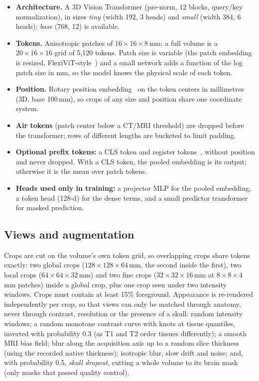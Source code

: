 \documentclass[10pt]{article}
\begin{document}
\begin{itemize}
  \item \textbf{Architecture.} A 3D Vision Transformer (pre-norm, 12 blocks, query/key normalization), in sizes
  \emph{tiny} (width 192, 3 heads) and \emph{small} (width 384, 6 heads); \emph{base} (768, 12) is available.
  \item \textbf{Tokens.} Anisotropic patches of $16\times16\times8$\,mm; a full volume is a $20\times16\times16$ grid
  of 5{,}120 tokens. Patch size is variable (the patch embedding is resized, FlexiViT-style~\cite{flexivit}) and a
  small network adds a function of the log patch size in mm, so the model knows the physical scale of each token.
  \item \textbf{Position.} Rotary position embedding~\cite{rope} on the token centers in millimetres (3D, base
  100\,mm), so crops of any size and position share one coordinate system.
  \item \textbf{Air tokens} (patch center below a CT/MRI threshold) are dropped before the transformer; rows of
  different lengths are bucketed to limit padding.
  \item \textbf{Optional prefix tokens:} a CLS token and register tokens~\cite{registers}, without position and never
  dropped. With a CLS token, the pooled embedding is its output; otherwise it is the mean over patch tokens.
  \item \textbf{Heads used only in training:} a projector MLP for the pooled embedding, a token head (128-d) for the
  dense terms, and a small predictor transformer for masked prediction.
\end{itemize}

\subsection{Views and augmentation}

Crops are cut on the volume's own token grid, so overlapping crops share tokens exactly: two global crops
($128\times128\times64$\,mm, the second inside the first), two local crops ($64\times64\times32$\,mm) and two fine crops
($32\times32\times16$\,mm at $8\times8\times4$\,mm patches) inside a global crop, plus one crop seen under two
intensity windows. Crops must contain at least 15\% foreground. Appearance is re-rendered independently per crop, so
that views can only be matched through anatomy, never through contrast, resolution or the presence of a skull:
random intensity windows; a random monotone contrast curve with knots at tissue quantiles, inverted with probability
0.3 (as T1 and T2 order tissues differently); a smooth MRI bias field; blur along the acquisition axis up to a
random slice thickness (using the recorded native thickness); isotropic blur, slow drift and noise; and, with
probability 0.5, \emph{skull dropout}, cutting a whole volume to its brain mask (only masks that passed quality
control).
\end{document}
